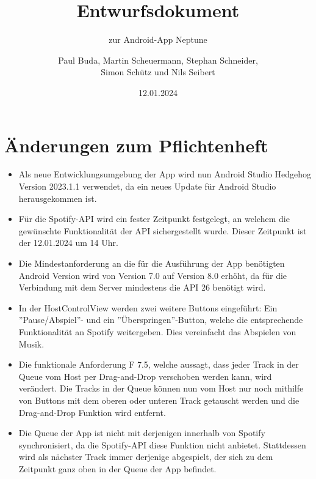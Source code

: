 \documentclass[oneside, ngerman]{sdqtechreport}
\author{Paul Buda, Martin Scheuermann, Stephan Schneider, \\
Simon Schütz und Nils Seibert}
\title{Entwurfsdokument}
\subtitle{zur Android-App Neptune}
\date{12.01.2024}
\begin{document}
\setpdf



\maketitle

\tableofcontents

\cleardoublepage


\chapter{Änderungen zum Pflichtenheft}
\label{chap:Änderungen zum Pflichtenheft}

\begin{itemize}
    \item Als neue Entwicklungsumgebung der App wird nun Android Studio Hedgehog Version 2023.1.1 verwendet, da ein neues Update für Android Studio herausgekommen ist.
    \item Für die Spotify-API wird ein fester Zeitpunkt festgelegt, an welchem die gewünschte Funktionalität der API sichergestellt wurde. Dieser Zeitpunkt ist der 12.01.2024 um 14 Uhr.
    \item Die Mindestanforderung an die für die Ausführung der App benötigten Android Version wird von Version 7.0 auf Version 8.0 erhöht, da für die Verbindung mit dem Server mindestens die API 26 benötigt wird.
    \item In der HostControlView werden zwei weitere Buttons eingeführt: Ein ''Pause/Abspiel''- und ein ''Überspringen''-Button, welche die entsprechende Funktionalität an Spotify weitergeben. Dies vereinfacht das Abspielen von Musik.
    \item Die funktionale Anforderung F 7.5, welche aussagt, dass jeder Track in der Queue vom Host per Drag-and-Drop verschoben werden kann, wird verändert. Die Tracks in der Queue können nun vom Host nur noch mithilfe von Buttons mit dem oberen oder unteren Track getauscht werden und die Drag-and-Drop Funktion wird entfernt.
    \item Die Queue der App ist nicht mit derjenigen innerhalb von Spotify synchronisiert, da die Spotify-API diese Funktion nicht anbietet. Stattdessen wird als nächster Track immer derjenige abgespielt, der sich zu dem Zeitpunkt ganz oben in der Queue der App befindet.
\end{itemize}
\end{document}
